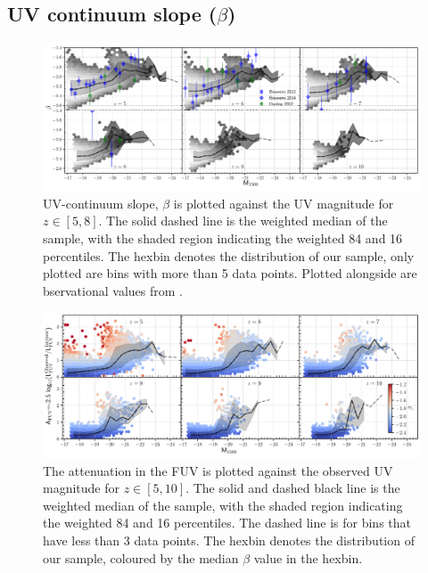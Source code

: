 
\subsection{UV continuum slope ($\beta$)}\label{sec: PhotProp.beta}
\begin{figure}
	\centering
	\includegraphics[width=\textwidth]{./figures/beta_lum_z5_10}
	\caption{UV-continuum slope, $\beta$ is plotted against the UV magnitude for $z\in[5,8]$. The solid dashed line is the weighted median of the sample, with the shaded region indicating the weighted 84 and 16 percentiles. The hexbin denotes the distribution of our sample, only plotted are bins with more than 5 data points. Plotted alongside are bservational values from \protect\cite{Dunlop2012,Bouwens2012b,Bouwens2014a}.\label{fig: beta}} 
\end{figure} 
\begin{figure}
	\centering
	\includegraphics[width=\textwidth]{./figures/att_lfuv_beta_z5_10}
	\caption{The attenuation in the FUV is plotted against the observed UV magnitude for $z\in[5,10]$. The solid and dashed black line is the weighted median of the sample, with the shaded region indicating the weighted 84 and 16 percentiles. The dashed line is for bins that have less than 3 data points. The hexbin denotes the distribution of our sample, coloured by the median $\beta$ value in the hexbin. \label{fig: att_lfuv}} 
\end{figure} 
